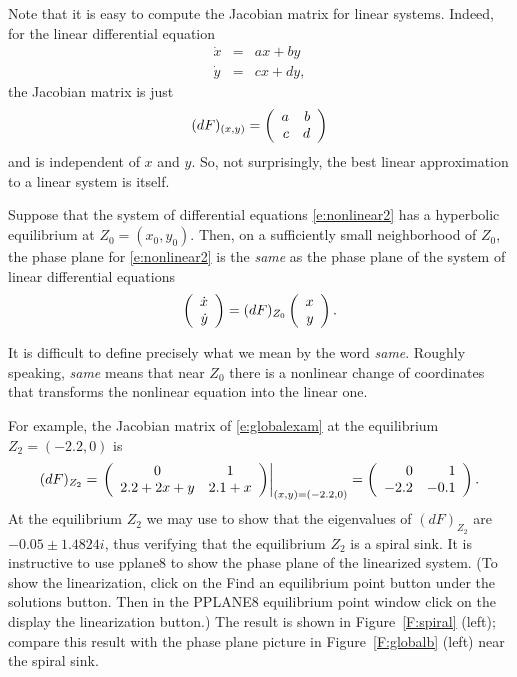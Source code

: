 \documentclass{ximera}
\begin{document}
Note that it is easy to compute the Jacobian matrix for linear 
systems.  Indeed, for the linear differential equation
\begin{eqnarray*}
\dot{x} & = & ax+by \\ \dot{y} & = & cx+dy,
\end{eqnarray*}
the Jacobian matrix is just 
\[
(dF)_{(x,y)} = \left(\begin{array}{rr} a & b\\ c &d\end{array}\right)
\]
and is independent of $x$ and $y$.  So, not surprisingly, the 
best linear approximation to a linear system is itself.

\begin{theorem} \label{T:linearization} 
Suppose that the system of differential equations
\eqref{e:nonlinear2} has a hyperbolic equilibrium at
$Z_0=(x_0,y_0)$.  Then, on a sufficiently small neighborhood of
$Z_0$, the phase plane for \eqref{e:nonlinear2} is the {\em
same\/} as the phase plane of the system of 
linear differential equations
\begin{equation}  \label{e:linearizedeqn}
\left(\begin{array}{r} \dot{x} \\ \dot{y}\end{array}\right) = (dF)_{Z_0} \left(\begin{array}{r} x \\ y\end{array}\right).
\end{equation}
\end{theorem}  
It is difficult to define precisely what we mean by the word
{\em same\/}. Roughly speaking, {\em same\/} means that near 
$Z_0$ there is a nonlinear change of coordinates that 
transforms the nonlinear equation into the linear one.

For example, the Jacobian matrix of \eqref{e:globalexam} at the
equilibrium $Z_2=(-2.2,0)$ is 
\[
(dF)_{Z_2} = \left.\left(\begin{array}{cc} 0 & 1\\ 2.2+2x+y &2.1+x\end{array}\right)\right|_{(x,y)=(-2.2,0)} 
= \left(\begin{array}{rr} 0 & 1\\ -2.2 &-0.1\end{array}\right).
\]
At the equilibrium $Z_2$ we may use \Matlab to show that the 
eigenvalues of $(dF)_{Z_2}$ are $-0.05\pm 1.4824i$, thus verifying 
that the equilibrium $Z_2$ is a spiral sink.  
It is instructive to use {\sf pplane8} to 
show the phase plane of 
the linearized system.  
(To show the linearization, click on the 
{\sf Find an equilibrium point} button under the {\sf solutions} 
button.  Then in the {\sf PPLANE8 equilibrium point} window click 
on the {\sf display the linearization} button.)  The result is
shown in Figure~\ref{F:spiral} (left); compare this result 
with the phase plane picture in Figure~\ref{F:globalb} (left) 
near the spiral sink.

\begin{figure*}[htb]
           \centerline{%
           }
           \caption{(Left) Trajectory of \protect\eqref{e:linearizedeqn} 
	     near the spiral sink $Z_2$. (Right) The time series $x$ 
		versus $t$ for this solution.}
           \label{F:spiral}
\end{figure*}
\end{document}
